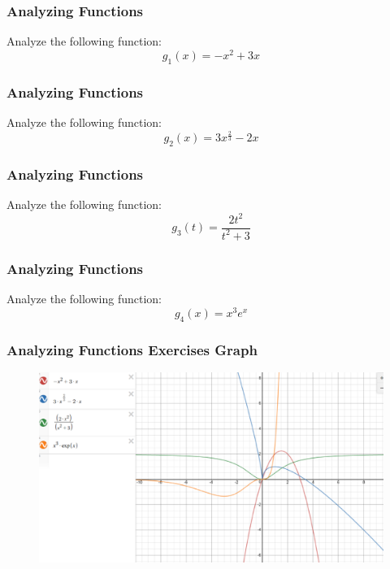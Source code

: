 \documentclass[xcolor=dvipsnames]{beamer}
\begin{document}
\begin{frame}
  \frametitle{Analyzing Functions}
{\ubung} Analyze the following function:
\begin{equation}
  \label{eq:ohkaedoy}
g_{1}(x)=-x^{2}+3x
\end{equation}
\end{frame}

\begin{frame}
  \frametitle{Analyzing Functions}
{\ubung} Analyze the following function:
\begin{equation}
  \label{eq:teecakie}
g_{2}(x)=3x^{\frac{2}{3}}-2x
\end{equation}
\end{frame}

\begin{frame}
  \frametitle{Analyzing Functions}
{\ubung} Analyze the following function:
\begin{equation}
  \label{eq:saepaego}
g_{3}(t)=\frac{2t^{2}}{t^{2}+3}
\end{equation}
\end{frame}

\begin{frame}
  \frametitle{Analyzing Functions}
{\ubung} Analyze the following function:
\begin{equation}
  \label{eq:xohsaemu}
g_{4}(x)=x^{3}e^{x}
\end{equation}
\end{frame}

\begin{frame}
  \frametitle{Analyzing Functions Exercises Graph}
  \begin{figure}[h]
    \includegraphics[scale=.4]{./diagrams/ft-11-AnalyzingFunctions.eps}
  \end{figure}
\end{frame}
\end{document}
